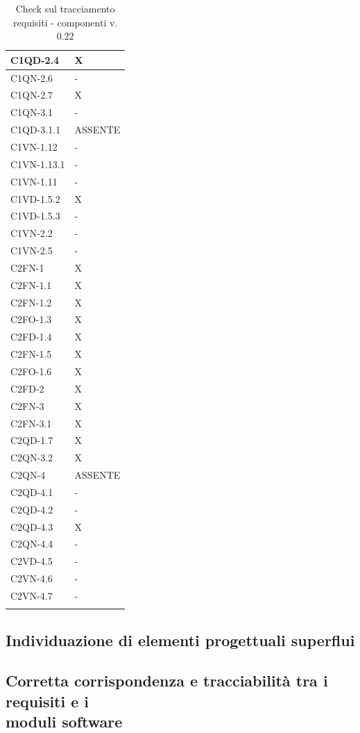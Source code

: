 \begin{footnotesize}
\begin{longtable}{|p{}|p{}|}
 C1QD-2.4&X  \\ \hline
 C1QN-2.6&-  \\ \hline
 C1QN-2.7&X    \\ \hline
 C1QN-3.1&-   \\ \hline
 C1QD-3.1.1&ASSENTE    \\ \hline
 C1VN-1.12&-  \\ \hline
 C1VN-1.13.1&-  \\ \hline
 C1VN-1.11&-  \\ \hline
 C1VD-1.5.2&X  \\ \hline
 C1VD-1.5.3&-   \\ \hline
 C1VN-2.2&- \\ \hline
 C1VN-2.5&-  \\ \hline
 C2FN-1&X    \\ \hline
 C2FN-1.1&X    \\ \hline
 C2FN-1.2&X   \\ \hline
 C2FO-1.3&X    \\ \hline
 C2FD-1.4&X   \\ \hline
 C2FN-1.5&X   \\ \hline
 C2FO-1.6&X   \\ \hline
 C2FD-2&X    \\ \hline
 C2FN-3&X   \\ \hline
 C2FN-3.1&X   \\ \hline
 C2QD-1.7&X   \\ \hline
 C2QN-3.2&X   \\ \hline
 C2QN-4 &ASSENTE  \\ \hline
 C2QD-4.1&-    \\ \hline
 C2QD-4.2&-   \\ \hline
 C2QD-4.3&X   \\ \hline
 C2QN-4.4&-  \\ \hline
 C2VD-4.5&-   \\ \hline
 C2VN-4.6&-    \\ \hline
 C2VN-4.7&-  \\ \hline

\caption{Check sul tracciamento requisiti - componenti v. 0.22}
\end{longtable}
\end{footnotesize}

\subsection*{Individuazione di elementi progettuali superflui}

\subsection*{Corretta corrispondenza e tracciabilit\`a tra i requisiti e  i\\
moduli software} 

